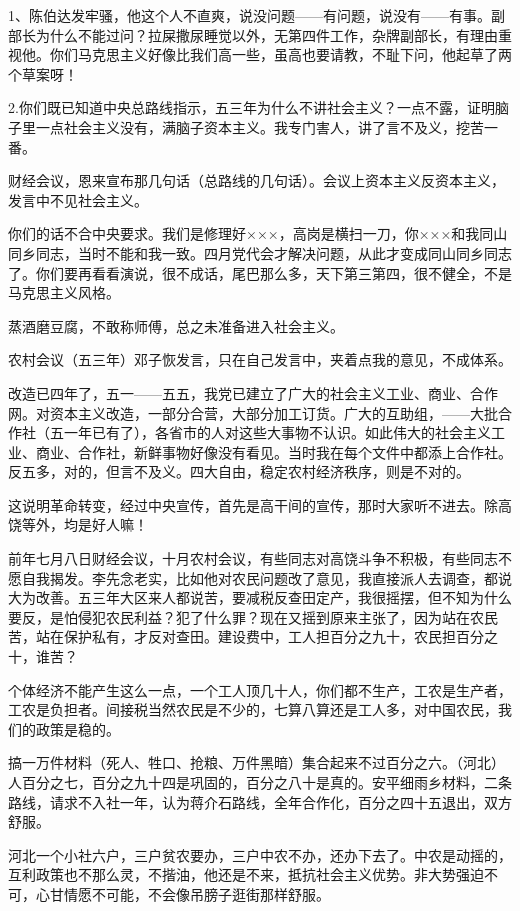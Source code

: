 1、陈伯达发牢骚，他这个人不直爽，说没问题——有问题，说没有——有事。副部长为什么不能过问？拉屎撒尿睡觉以外，无第四件工作，杂牌副部长，有理由重视他。你们马克思主义好像比我们高一些，虽高也要请教，不耻下问，他起草了两个草案呀！

2.你们既已知道中央总路线指示，五三年为什么不讲社会主义？一点不露，证明脑子里一点社会主义没有，满脑子资本主义。我专门害人，讲了言不及义，挖苦一番。

财经会议，恩来宣布那几句话（总路线的几句话）。会议上资本主义反资本主义，发言中不见社会主义。

你们的话不合中央要求。我们是修理好×××，高岗是横扫一刀，你×××和我同山同乡同志，当时不能和我一致。四月党代会才解决问题，从此才变成同山同乡同志了。你们要再看看演说，很不成话，尾巴那么多，天下第三第四，很不健全，不是马克思主义风格。

蒸酒磨豆腐，不敢称师傅，总之未准备进入社会主义。

农村会议（五三年）邓子恢发言，只在自己发言中，夹着点我的意见，不成体系。

改造已四年了，五一——五五，我党已建立了广大的社会主义工业、商业、合作网。对资本主义改造，一部分合营，大部分加工订货。广大的互助组，——大批合作社（五一年已有了），各省市的人对这些大事物不认识。如此伟大的社会主义工业、商业、合作社，新鲜事物好像没有看见。当时我在每个文件中都添上合作社。反五多，对的，但言不及义。四大自由，稳定农村经济秩序，则是不对的。

这说明革命转变，经过中央宣传，首先是高干间的宣传，那时大家听不进去。除高饶等外，均是好人嘛！

前年七月八日财经会议，十月农村会议，有些同志对高饶斗争不积极，有些同志不愿自我揭发。李先念老实，比如他对农民问题改了意见，我直接派人去调查，都说大为改善。五三年大区来人都说苦，要减税反查田定产，我很摇摆，但不知为什么要反，是怕侵犯农民利益？犯了什么罪？现在又摇到原来主张了，因为站在农民苦，站在保护私有，才反对查田。建设费中，工人担百分之九十，农民担百分之十，谁苦？

个体经济不能产生这么一点，一个工人顶几十人，你们都不生产，工农是生产者，工农是负担者。间接税当然农民是不少的，七算八算还是工人多，对中国农民，我们的政策是稳的。

搞一万件材料（死人、牲口、抢粮、万件黑暗）集合起来不过百分之六。（河北）人百分之七，百分之九十四是巩固的，百分之八十是真的。安平细雨乡材料，二条路线，请求不入社一年，认为蒋介石路线，全年合作化，百分之四十五退出，双方舒服。

河北一个小社六户，三户贫农要办，三户中农不办，还办下去了。中农是动摇的，互利政策也不那么灵，不揩油，他还是不来，抵抗社会主义优势。非大势强迫不可，心甘情愿不可能，不会像吊膀子逛街那样舒服。

